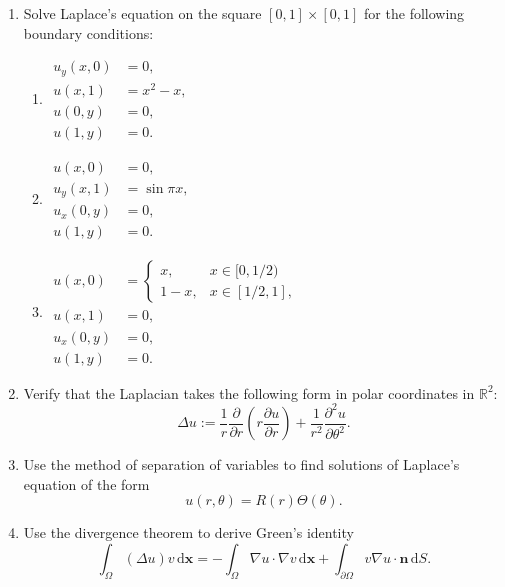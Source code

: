 \begin{enumerate}[label=\thesection.\arabic*.,ref=\thesection.\arabic*,start=12,series=book-problems]
\item\label{ex:square-mixed-boundary-problems} Solve Laplace's equation on the square $[0,1]\times[0,1]$ for the following boundary conditions:\begin{enumerate}[label=(\alph*)]
\item $\begin{aligned}
u_y(x,0)&=0,\\u(x,1)&=x^2-x,\\u(0,y)&=0,\\u(1,y)&=0.
\end{aligned}$
\item $\begin{aligned}
u(x,0)&=0,\\u_y(x,1)&=\sin\pi x,\\u_x(0,y)&=0,\\u(1,y)&=0.
\end{aligned}$
\item $\begin{aligned}
u(x,0)&=\begin{cases}x,&x\in[0,1/2)\\1-x,&x\in[1/2,1],\end{cases}\\
u(x,1)&=0,\\u_x(0,y)&=0,\\u(1,y)&=0.
\end{aligned}$
\end{enumerate}

\item\label{ex:laplacian-polar-coordinates} Verify that the Laplacian takes the following form in polar coordinates in $\mathbb{R}^2$:
\[
\Delta u:=\dfrac1r\dfrac{\partial}{\partial r}\left(r\dfrac{\partial u}{\partial r}\right)+\dfrac1{r^2}\dfrac{\partial^2u}{\partial\theta^2}.
\]


\item\label{ex:polar-separated-solutions} Use the method of separation of variables to find solutions of Laplace's equation of the form
\[
u(r,\theta)=R(r)\Theta(\theta).
\]


\item\label{ex:derive-green-identity} Use the divergence theorem to derive Green's identity
\[
\int_\Omega(\Delta u)v\,\mathrm{d}\bm{x}=-\int_\Omega\nabla u\cdot\nabla v\,\mathrm{d}\bm{x}+\int_{\partial\Omega}v\nabla u\cdot\bm{n}\,\mathrm{d}S.
\]


\end{enumerate}
